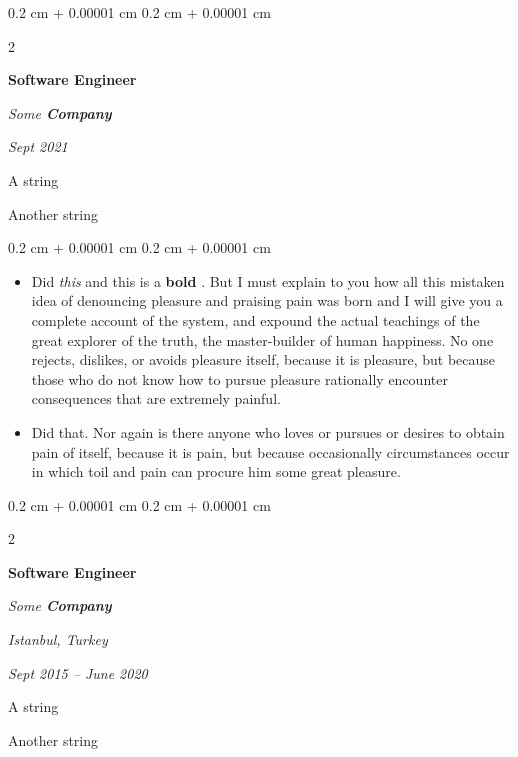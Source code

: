 \documentclass[10pt, letterpaper]{article}
\newenvironment{summary}{
    \begin{description}[
        topsep=0.10 cm,
        parsep=0.10 cm,
        partopsep=0pt,
        itemsep=0pt,
        leftmargin=0.4 cm + 10pt
    ]
}{
    \end{description}
} %
\newenvironment{highlights}{
    \begin{itemize}[
        topsep=0.10 cm,
        parsep=0.10 cm,
        partopsep=0pt,
        itemsep=0pt,
        leftmargin=0.4 cm + 10pt
    ]
}{
    \end{itemize}
} %
\newenvironment{onecolentry}{
    \begin{adjustwidth}{
        0.2 cm + 0.00001 cm
    }{
        0.2 cm + 0.00001 cm
    }
}{
    \end{adjustwidth}
} %
\newenvironment{twocolentry}[2][]{
    \onecolentry
    \def\secondColumn{#2}
    \setcolumnwidth{\fill, 4.5 cm}
    \begin{paracol}{2}
}{
    \switchcolumn \raggedleft \secondColumn
    \end{paracol}
    \endonecolentry
} %
\let\hrefWithoutArrow\href
\renewcommand{\href}[2]{\hrefWithoutArrow{#1}{\ifthenelse{\equal{#2}{}}{ }{#2 }\raisebox{.15ex}{\footnotesize \faExternalLink*}}}
\begin{document}
        \begin{twocolentry}{
            
            
        \textit{Sept 2021}}
            \textbf{Software Engineer}
            
            \textit{Some \textbf{Company}}
        \end{twocolentry}
            \begin{summary}
                \item A string
                \item Another string
            \end{summary}
        \vspace{0.10 cm}
        \begin{onecolentry}
            \begin{highlights}
                \item Did \textit{this} and this is a \textbf{bold} \href{https://example.com}{link}. But I must explain to you how all this mistaken idea of denouncing pleasure and praising pain was born and I will give you a complete account of the system, and expound the actual teachings of the great explorer of the truth, the master-builder of human happiness. No one rejects, dislikes, or avoids pleasure itself, because it is pleasure, but because those who do not know how to pursue pleasure rationally encounter consequences that are extremely painful.
                \item Did that. Nor again is there anyone who loves or pursues or desires to obtain pain of itself, because it is pain, but because occasionally circumstances occur in which toil and pain can procure him some great pleasure.
            \end{highlights}
        \end{onecolentry}


        \vspace{0.2 cm}

        \begin{twocolentry}{
        \textit{Istanbul, Turkey}    
            
        \textit{Sept 2015 – June 2020}}
            \textbf{Software Engineer}
            
            \textit{Some \textbf{Company}}
        \end{twocolentry}
            \begin{summary}
                \item A string
                \item Another string
            \end{summary}
\end{document}

